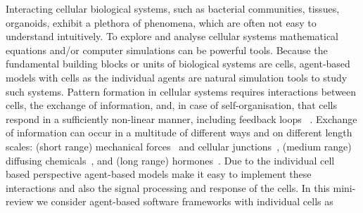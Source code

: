 Interacting cellular biological systems, such as bacterial communities, tissues,
organoids, exhibit a plethora of phenomena, which are often not easy to understand intuitively.
To explore and analyse cellular systems mathematical equations and/or computer
simulations can be powerful tools.
Because the fundamental building blocks or units of biological systems are cells,
agent-based models with cells as the individual agents are natural simulation tools to
study such systems.
Pattern formation in cellular systems requires interactions between cells, the exchange
of information, and, in case of self-organisation, that cells respond in a sufficiently
non-linear manner, including feedback loops
~\cite{Mitrophanov2008,Deritei2019}.
Exchange of information can occur in a multitude of different ways and on different
length scales: (short range) mechanical forces~\cite{viningMechanicalForcesDirect2017}
and cellular junctions~\cite{Bloemendal2013}, (medium range)
diffusing chemicals~\cite{Duester2008}, and (long range)
hormones~\cite{GREENWOOD1966}.
Due to the individual cell based perspective agent-based models make it easy to implement
these interactions and also the signal processing and response of the cells.
In this mini-review we consider agent-based software frameworks with individual cells as
